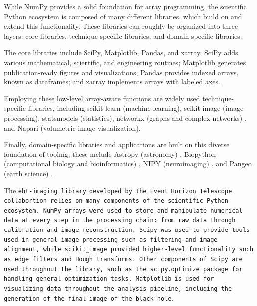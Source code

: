 

While NumPy provides a solid foundation for array programming, the scientific
Python ecosystem is composed of many different libraries, which build on and
extend this functionality.
These libraries can roughly be organized into three layers:
core libraries, technique-specific libraries, and domain-specific libraries.

The core libraries include SciPy, Matplotlib, Pandas, and xarray.
SciPy adds various mathematical, scientific, and engineering routines;
Matplotlib generates publication-ready figures and visualizations,
Pandas provides indexed arrays, known as dataframes; and
xarray implements arrays with labeled axes.

Employing these low-level array-aware functions are widely used
technique-specific libraries, including scikit-learn (machine learning),
scikit-image (image processing), statsmodels (statistics),  networkx (graphs
and complex networks) \cite{SciPyProceedings_11}, and Napari (volumetric image
visualization).

Finally, domain-specific libraries and applications are built on this diverse
foundation of tooling; these include Astropy (astronomy) \cite{astropy:2013,
astropy:2018}, Biopython (computational biology and bioinformatics) \cite{cock2009biopython},
NIPY (neuroimaging) \cite{millman2007analysis}, and Pangeo (earth science) \cite{2018EGUGA..2012146H}.


The \tt{eht-imaging} library developed by the Event Horizon Telescope 
collabortion relies on many components of the scientific Python ecosystem.
NumPy arrays were used to store and manipulate numerical data at every step
in the processing chain: from raw data through calibration and image 
reconstruction.
Scipy was used to provide tools used in general image processing such as 
filtering and image alignment, while scikit\_image provided higher-level
functionality such as edge filters and Hough transforms.
Other components of Scipy are used throughout the library, such as the
\tt{scipy.optimize} package for handling general optimization tasks.
Matplotlib is used for visualizing data throughout the analysis pipeline,
including the generation of the final image of the black hole.

